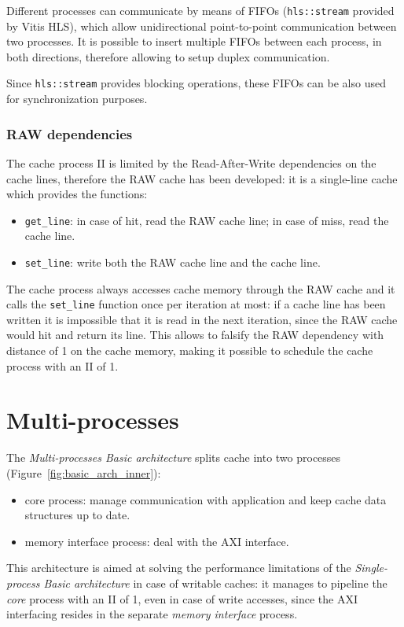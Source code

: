 \documentclass[11pt,a4paper]{memoir}
\begin{document}
Different processes can communicate by means of FIFOs (\texttt{hls::stream}
provided by Vitis HLS), which allow unidirectional point-to-point communication
between two processes. It is possible to insert multiple FIFOs between each
process, in both directions, therefore allowing to setup duplex communication.

Since \texttt{hls::stream} provides blocking operations, these FIFOs can be also
used for synchronization purposes.

\subsubsection{RAW dependencies}
The cache process II is limited by the Read-After-Write dependencies on the
cache lines, therefore the RAW cache has been developed: it is a single-line
cache which provides the functions:
\begin{itemize}
	\item \texttt{get\_line}: in case of hit, read the RAW cache line;
		in case of miss, read the cache line.
	\item \texttt{set\_line}: write both the RAW cache line and the cache
		line.
\end{itemize}

The cache process always accesses cache memory through the RAW cache and it
calls the \texttt{set\_line} function once per iteration at most: if a cache
line has been written it is impossible that it is read in the next iteration,
since the RAW cache would hit and return its line. This allows to falsify the
RAW dependency with distance of 1 on the cache memory, making it possible to
schedule the cache process with an II of 1.

\section{Multi-processes}
The \emph{Multi-processes Basic architecture} splits cache into two processes
(Figure~\ref{fig:basic_arch_inner}):
\begin{itemize}
	\item core process: manage communication with application and keep
		cache data structures up to date.
	\item memory interface process: deal with the AXI interface.
\end{itemize}

This architecture is aimed at solving the performance limitations of the
\emph{Single-process Basic architecture} in case of writable caches: it manages
to pipeline the \emph{core} process with an II of 1, even in case of write
accesses, since the AXI interfacing resides in the separate \emph{memory
interface} process.
\end{document}
